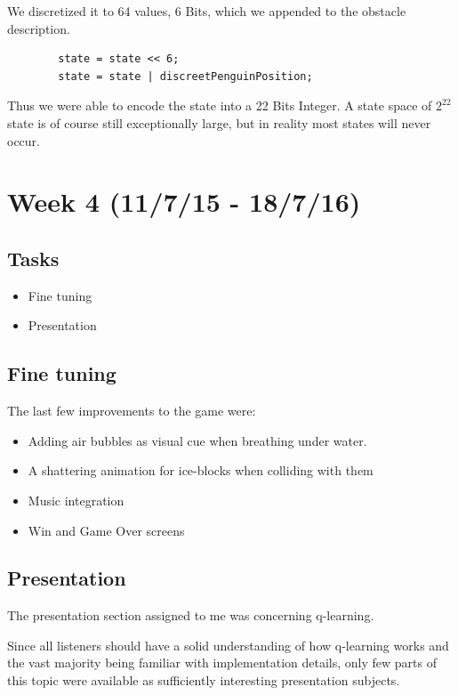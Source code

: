 \documentclass{article}
\begin{document}
        We discretized it to 64 values, 6 Bits, which we appended to the obstacle description.

        \begin{lstlisting}
        state = state << 6;
        state = state | discreetPenguinPosition;
        \end{lstlisting}

        Thus we were able to encode the state into a 22 Bits Integer. A state space of $2^22$ state is of course still exceptionally large, but in reality most states will never occur.

\section{Week 4 (11/7/15 - 18/7/16)}
    \subsection{Tasks}
    \begin{itemize}
        \item Fine tuning
        \item Presentation
    \end{itemize}
    \subsection{Fine tuning}
        The last few improvements to the game were:
        \begin{itemize}
            \item Adding air bubbles as visual cue when breathing under water.
            \item A shattering animation for ice-blocks when colliding with them
            \item Music integration
            \item Win and Game Over screens
        \end{itemize}

    \subsection{Presentation}
        The presentation section assigned to me was concerning q-learning.

        Since all listeners should have a solid understanding of how q-learning works and the vast majority being familiar with implementation details, only few parts of this topic were available as sufficiently interesting presentation subjects.
\end{document}

